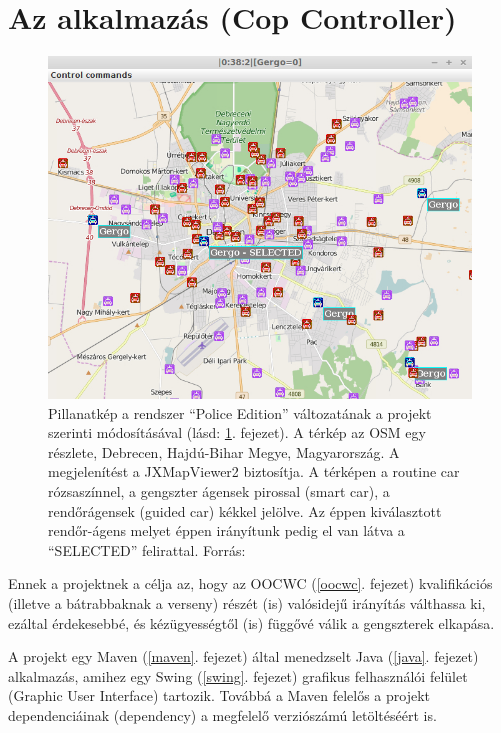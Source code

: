 \documentclass[a4paper,12pt]{report}
\begin{document}
\newpage
\chapter{Az alkalmazás (Cop Controller)}
\label{theapp}

\begin{figure}[ht]
\centerline{
\includegraphics[width=6in]{img/copselected}}
\caption{Pillanatkép a rendszer ``Police Edition'' változatának a projekt szerinti módosításával (lásd: \ref{theapp}. fejezet). A térkép az OSM egy részlete, Debrecen, Hajdú-Bihar Megye, Magyarország. A megjelenítést a JXMapViewer2 \cite{jxmapv} biztosítja. A térképen a routine car rózsaszínnel, a gengszter ágensek pirossal (smart car), a rendőrágensek (guided car) kékkel jelölve. Az éppen kiválasztott rendőr-ágens melyet éppen irányítunk pedig el van látva a ``SELECTED'' felirattal. Forrás: \cite{infocomjournal} 
\label{police}}
\end{figure}

Ennek a projektnek a célja az, hogy az OOCWC (\ref{oocwc}. fejezet) kvalifikációs (illetve a bátrabbaknak a verseny) részét (is) valósidejű irányítás válthassa ki, ezáltal érdekesebbé, és kézügyességtől (is) függővé válik a gengszterek elkapása.

\vspace{2mm}
A projekt egy Maven (\ref{maven}. fejezet) által menedzselt Java (\ref{java}. fejezet) alkalmazás, amihez egy Swing (\ref{swing}. fejezet) grafikus felhasználói felület (Graphic User Interface) tartozik. Továbbá a Maven felelős a projekt dependenciáinak (dependency) a megfelelő verziószámú letöltéséért is. 
\end{document}
